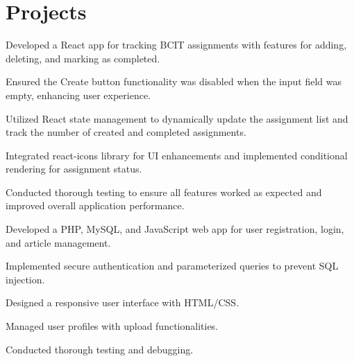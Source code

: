 \documentclass[]{plushcv}
\begin{document}
\begin{minipage}[t]{0.65 \textwidth}


\section{Projects}
\begin{tightemize}
\item Developed a React app for tracking BCIT assignments with features for adding, deleting, and marking as completed.
\item Ensured the Create button functionality was disabled when the input field was empty, enhancing user experience.
\item Utilized React state management to dynamically update the assignment list and track the number of created and completed assignments.
\item Integrated react-icons library for UI enhancements and implemented conditional rendering for assignment status.
\item Conducted thorough testing to ensure all features worked as expected and improved overall application performance.
\end{tightemize}
\sectionsep

\begin{tightemize}
\item Developed a PHP, MySQL, and JavaScript web app for user registration, login, and article management.
\item Implemented secure authentication and parameterized queries to prevent SQL injection.
\item Designed a responsive user interface with HTML/CSS.
\item Managed user profiles with upload functionalities.
\item Conducted thorough testing and debugging.
\end{tightemize}



\end{minipage}
\end{document}
